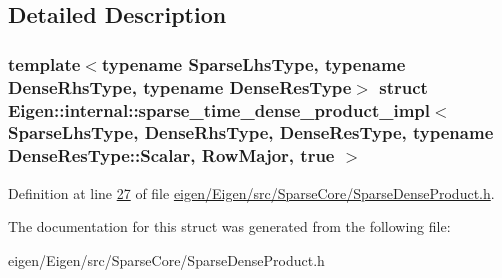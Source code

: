 \subsection{Detailed Description}
\subsubsection*{template$<$typename Sparse\+Lhs\+Type, typename Dense\+Rhs\+Type, typename Dense\+Res\+Type$>$\newline
struct Eigen\+::internal\+::sparse\+\_\+time\+\_\+dense\+\_\+product\+\_\+impl$<$ Sparse\+Lhs\+Type, Dense\+Rhs\+Type, Dense\+Res\+Type, typename Dense\+Res\+Type\+::\+Scalar, Row\+Major, true $>$}



Definition at line \hyperlink{eigen_2_eigen_2src_2_sparse_core_2_sparse_dense_product_8h_source_l00027}{27} of file \hyperlink{eigen_2_eigen_2src_2_sparse_core_2_sparse_dense_product_8h_source}{eigen/\+Eigen/src/\+Sparse\+Core/\+Sparse\+Dense\+Product.\+h}.



The documentation for this struct was generated from the following file\+:\begin{DoxyCompactItemize}
\item 
eigen/\+Eigen/src/\+Sparse\+Core/\+Sparse\+Dense\+Product.\+h\end{DoxyCompactItemize}
